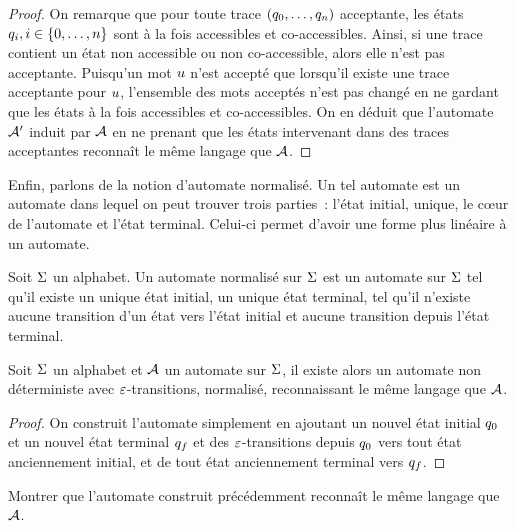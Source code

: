 \begin{proof}
  On remarque que pour toute trace $(q_{0},\ldots,q_{n})$ acceptante, les
  états $q_{i}, i \in \{0,\ldots,n\}$ sont à la fois accessibles et
  co-accessibles. Ainsi, si une trace contient un état non accessible ou non
  co-accessible, alors elle n'est pas acceptante. Puisqu'un mot $u$ n'est
  accepté que lorsqu'il existe une trace acceptante pour $u$, l'ensemble
  des mots acceptés n'est pas changé en ne gardant que les états à la fois
  accessibles et co-accessibles. On en déduit que l'automate $\mathcal{A}'$ induit
  par $\mathcal{A}$ en ne prenant que les états intervenant dans des traces
  acceptantes reconnaît le même langage que $\mathcal{A}$.
\end{proof}

Enfin, parlons de la notion d'automate normalisé. Un tel automate est un
automate dans lequel on peut trouver trois parties~: l'état initial,
unique, le c\oe ur de l'automate et l'état terminal. Celui-ci permet d'avoir
une forme plus linéaire à un automate.

\begin{definition}
  Soit $\Sigma$ un alphabet. Un automate normalisé sur $\Sigma$ est un automate sur
  $\Sigma$ tel qu'il existe un unique état initial, un unique état terminal, tel
  qu'il n'existe aucune transition d'un état vers l'état initial et aucune
  transition depuis l'état terminal.
\end{definition}

\begin{proposition}
  Soit $\Sigma$ un alphabet et $\mathcal{A}$ un automate sur $\Sigma$, il existe alors
  un automate non déterministe avec $\varepsilon$-transitions, normalisé, reconnaissant
  le même langage que $\mathcal{A}$.
\end{proposition}

\begin{proof}
  On construit l'automate simplement en ajoutant un nouvel état initial $q_{0}$
  et un nouvel état terminal $q_{f}$ et des $\varepsilon$-transitions depuis
  $q_{0}$ vers tout état anciennement initial, et de tout état anciennement
  terminal vers $q_{f}$.
\end{proof}

\begin{exercise}
  Montrer que l'automate construit précédemment reconnaît le même langage que
  $\mathcal{A}$.
\end{exercise}

